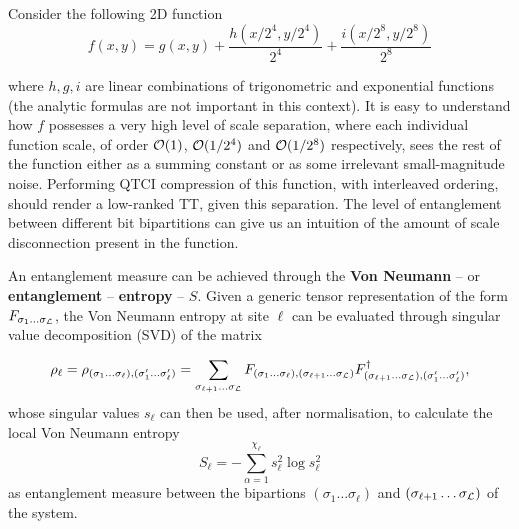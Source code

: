 \begin{example}
	Consider the following 2D function 
	\begin{equation}
		f(x,y) = g(x,y) + \frac{ h(x/2^4,y/2^4)}{2^4} + \frac{i(x/2^8,y/2^8)}{2^8}
		\label{eq:scaleSepFunc}
	\end{equation}

	where $h,g,i$ are linear combinations of trigonometric and exponential functions (the analytic formulas are not important in this context). It is easy to understand how $f$ possesses a very high level of scale separation, where each individual function scale, of order $\mathcal{O}(1)$, $\mathcal{O}(1/2^4)$ and $\mathcal{O}(1/2^8)$ respectively, sees the rest of the function either as a summing constant or as some irrelevant small-magnitude noise. Performing QTCI compression of this function, with interleaved ordering, should render a low-ranked TT, given this separation. The level of entanglement between different bit bipartitions can give us an intuition of the amount of scale disconnection present in the function. 
	
	An entanglement measure can be achieved through the \textbf{Von Neumann} -- or \textbf{entanglement} -- \textbf{entropy} -- $S$. Given a generic tensor representation of the form $F_{\sigma_1\dots\sigma_{\mathcal{L}}}$, the Von Neumann entropy at site $\ell$ can be evaluated through singular value decomposition (SVD) of the matrix 
	
	\begin{equation}\rho_\ell = \rho_{(\sigma_1\dots\sigma_\ell),(\sigma'_1\dots\sigma'_\ell)} = \sum_{\sigma_{\ell +1}\dots\sigma_{\mathcal{L}}}F_{(\sigma_1\dots\sigma_\ell),(\sigma_{\ell+1}\dots\sigma_{\mathcal{L}})}F^\dag_{(\sigma_{\ell+1}\dots\sigma_{\mathcal{L}}),(\sigma'_1\dots\sigma'_\ell)},\end{equation}
	whose singular values $s_\ell$ can then be used, after normalisation, to calculate the local Von Neumann entropy 
	\begin{equation}
		S_\ell = - \sum_{\alpha=1}^{\chi_\ell} s_\ell^2 \log s_\ell^2
	\end{equation}
	as entanglement measure between the bipartions $(\sigma_1\dots\sigma_\ell)$ and $(\sigma_{\ell+1}\dots\sigma_{\mathcal{L}})$ of the system.
	

\end{example}
